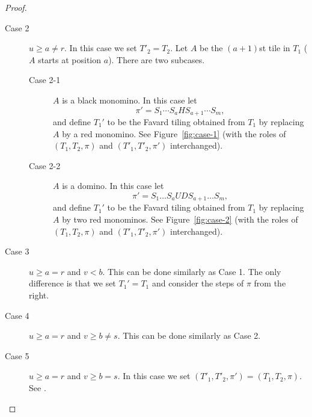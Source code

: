 \documentclass[oneside]{book}
\numberwithin{equation}{section}
\theoremstyle{definition}
\begin{document}
\begin{proof}
\begin{description}
\item[Case 2] \( u\ge a\ne r \). In this case we set \( T'_2=T_2 \). Let
  \( A \) be the \( (a+1) \)st tile in \( T_1 \) (\( A \) starts at position
  \( a \)). There are two subcases.
  \begin{description}
  \item[Case 2-1] $A$ is a black monomino. In this case let
    \[
      \pi' = S_1\cdots S_a H S_{a+1} \cdots S_m,
\]
and define $T_1'$ to be the Favard tiling obtained from $T_1$ by
replacing $A$ by a red monomino. See Figure~\ref{fig:case-1} (with the
roles of \( (T_1,T_2,\pi) \) and \( (T'_1,T'_2,\pi') \) interchanged).
\item[Case 2-2] $A$ is a domino. In this case let
    \[
      \pi' = S_1\dots S_a UD S_{a+1} \dots S_m,
\]
and define $T_1'$ to be the Favard tiling obtained from $T_1$ by
replacing $A$ by two red monominos. See Figure~\ref{fig:case-2} (with
the roles of \( (T_1,T_2,\pi) \) and \( (T'_1,T'_2,\pi') \)
interchanged).
\end{description}
\item[Case 3] \( u\ge a = r \) and \( v<b \). This can be done
  similarly as Case 1. The only difference is that we set
  \( T_1' = T_1 \) and consider the steps of \( \pi \) from the right.
  
\item[Case 4] \( u\ge a = r \) and \( v\ge b \ne s \).
  This can be done similarly as Case 2.

\item[Case 5] \( u\ge a = r \) and \( v\ge b=s \). In this case we set
  \( (T'_1,T'_2,\pi') = (T_1,T_2,\pi) \). See .
\end{description}


\end{proof}
\end{document}
